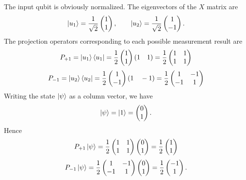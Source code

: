 \documentclass[10pt]{article}
\begin{document}
The input qubit is obviously normalized.  The eigenvectors of the $X$ matrix are
\[
\ket{u_1} = \frac{1}{\sqrt{2}} \begin{pmatrix}
1 \\
1
\end{pmatrix}, \qquad
\ket{u_2} = \frac{1}{\sqrt{2}} \begin{pmatrix}
1 \\
-1
\end{pmatrix}.
\]
The projection operators corresponding to each possible measurement result are
\[
P_{+1} = \ket{u_1} \bra{u_1} = \frac{1}{2} 
\begin{pmatrix}
1 \\
1
\end{pmatrix} (1 \quad 1) 
= \frac{1}{2}
\begin{pmatrix}
1 & 1 \\
1 & 1
\end{pmatrix}
\]
\[
P_{-1} = \ket{u_2} \bra{u_2} = \frac{1}{2}
\begin{pmatrix}
1 \\
-1
\end{pmatrix} (1 \quad -1) 
= \frac{1}{2}
\begin{pmatrix}
1 & -1 \\
-1 & 1
\end{pmatrix}
\]
Writing the state $\ket{\psi}$ as a column vector, we have
\[
\ket{\psi} = \ket{1} = \begin{pmatrix}
0 \\
1
\end{pmatrix}.
\]
Hence
\[
P_{+1}\ket{\psi} = \frac{1}{2} 
\begin{pmatrix}
1 & 1 \\
1 & 1
\end{pmatrix}
\begin{pmatrix}
0 \\
1
\end{pmatrix} =
\frac{1}{2} \begin{pmatrix}
1 \\
1
\end{pmatrix}
\]
\[
P_{-1}\ket{\psi} = \frac{1}{2}
\begin{pmatrix}
1   & -1 \\
-1 & 1
\end{pmatrix}
\begin{pmatrix}
0 \\
1
\end{pmatrix}
=
\frac{1}{2} \begin{pmatrix}
-1 \\
1
\end{pmatrix}.
\]
\end{document}
